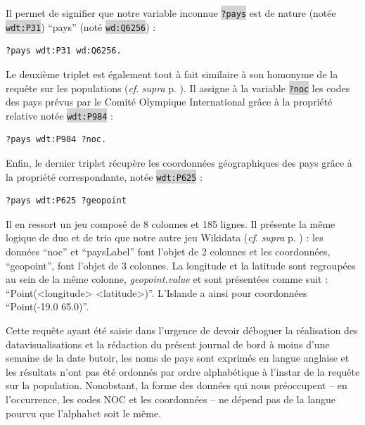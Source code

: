 \documentclass[hidelinks, 12pt]{report}
\newcommand{\code}[1]{\colorbox{LightGray}{\texttt{#1}}}
\begin{document}
Il permet de signifier que notre variable inconnue \code{?pays} est de nature (notée \code{wdt:P31}) \enquote{pays} (noté \code{wd:Q6256}) :

\begin{lstlisting}[language=SPARQL]
	?pays wdt:P31 wd:Q6256.
\end{lstlisting}

Le deuxième triplet est également tout à fait similaire à son homonyme de la requête sur les populations (\textit{cf}. \textit{supra} p. \pageref{query1}). Il assigne à la variable \code{?noc} les codes des pays prévus par le Comité Olympique International grâce à la propriété relative notée \code{wdt:P984} :

\begin{lstlisting}[language=SPARQL]
	?pays wdt:P984 ?noc.
\end{lstlisting}

Enfin, le dernier triplet récupère les coordonnées géographiques des pays grâce à la propriété correspondante, notée \code{wdt:P625} :

\begin{lstlisting}[language=SPARQL]
	?pays wdt:P625 ?geopoint
\end{lstlisting}

Il en ressort un jeu composé de 8 colonnes et 185 lignes. Il présente la même logique de duo et de trio que notre autre jeu Wikidata (\textit{cf}. \textit{supra} p. \pageref{query1tab}) : les données \enquote{noc} et \enquote{paysLabel} font l'objet de 2 colonnes et les coordonnées, \enquote{geopoint}, font l'objet de 3 colonnes. La longitude et la latitude sont regroupées au sein de la même colonne, \textit{geopoint.value} et sont présentées comme suit : \enquote{Point(<longitude> <latitude>)}. L'Islande a ainsi pour coordonnées \enquote{Point(-19.0 65.0)}.

Cette requête ayant été saisie dans l'urgence de devoir déboguer la réalisation des datavisualisations et la rédaction du présent journal de bord à moins d'une semaine de la date butoir, les noms de pays sont exprimés en langue anglaise et les résultats n'ont pas été ordonnés par ordre alphabétique à l'instar de la requête sur la population. Nonobstant, la forme des données qui nous préoccupent -- en l'occurrence, les codes NOC et les coordonnées -- ne dépend pas de la langue pourvu que l'alphabet soit le même.





%
\end{document}
